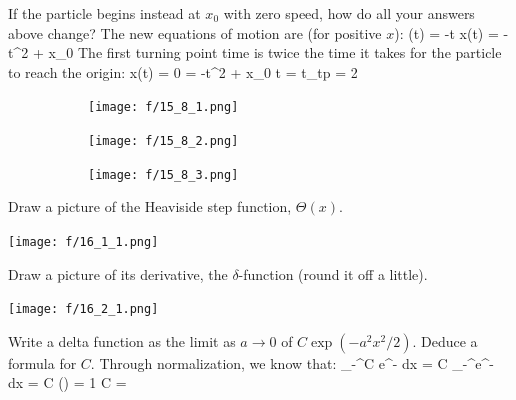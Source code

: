 \item If the particle begins instead at $x_0$ with zero
speed, how do all your answers above change?
\newline The new equations of motion are (for positive $x$):
\be
{}(t) = -t \quad\quad\quad x(t) = -t^2 + x_0
\ee
The first turning point time is twice the time it takes for the particle to reach the origin:
\be
x(t) = 0 = -t^2 + x_0 \thus t =  \thus t_{tp} = 2 
\ee
\begin{figure}[h!]
\begin{center}
\begin{subfigure}[h]{.26\textwidth}
    \begin{center}
    \texttt{[image: f/15\_8\_1.png]}
    \end{center}
\end{subfigure}
\begin{subfigure}[h]{.26\textwidth}
    \begin{center}
    \texttt{[image: f/15\_8\_2.png]}
    \end{center}
\end{subfigure}
\begin{subfigure}[h]{.28\textwidth}
    \begin{center}
    \texttt{[image: f/15\_8\_3.png]}
    \end{center}
\end{subfigure}
\end{center}
\end{figure}
\enu
\newpage
{}
\benu
\item Draw a picture of the Heaviside step function, $\Theta(x)$.
\begin{center}
\texttt{[image: f/16\_1\_1.png]}
\end{center}
\item Draw a picture of its derivative, the $\delta$-function (round it off a little).
\begin{center}
\texttt{[image: f/16\_2\_1.png]}
\end{center}
\item Write a delta function as the limit as $a\to 0$ of $C\exp(-a^2x^2/2)$.  Deduce
a formula for $C$.
\newline Through normalization, we know that:
\be
\int_{-\infty}^\infty C e^{-} dx = C \int_{-\infty}^\infty e^{-} dx = C \left(\right) = 1 \thus C = 
\ee

